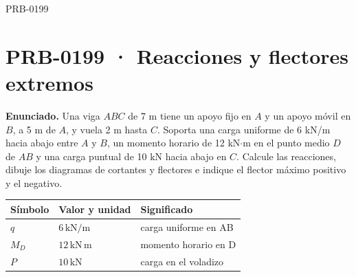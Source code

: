 \begin{studiumworked}{PRB-0199}

\section{PRB-0199 · Reacciones y flectores extremos}

\textbf{Enunciado.} Una viga $A B C$ de 7 m tiene un apoyo fijo en $A$ y un apoyo móvil en $B$, a 5 m de $A$, y vuela 2 m hasta $C$. Soporta una carga uniforme de 6 kN/m hacia abajo entre $A$ y $B$, un momento horario de 12 kN$\cdot$m en el punto medio $D$ de $AB$ y una carga puntual de 10 kN hacia abajo en $C$. Calcule las reacciones, dibuje los diagramas de cortantes y flectores e indique el flector máximo positivo y el negativo.

\par\medskip\noindent\begin{tabular}{@{}p{.18\linewidth}p{.26\linewidth}p{.48\linewidth}@{}}
\toprule Símbolo & Valor y unidad & Significado\\\midrule
$q$ & $6\,\mathrm{kN/m}$ & carga uniforme en AB\\
$M_{D}$ & $12\,\mathrm{kN\,m}$ & momento horario en D\\
$P$ & $10\,\mathrm{kN}$ & carga en el voladizo\\
\bottomrule\end{tabular}\par\medskip


\end{studiumworked}

